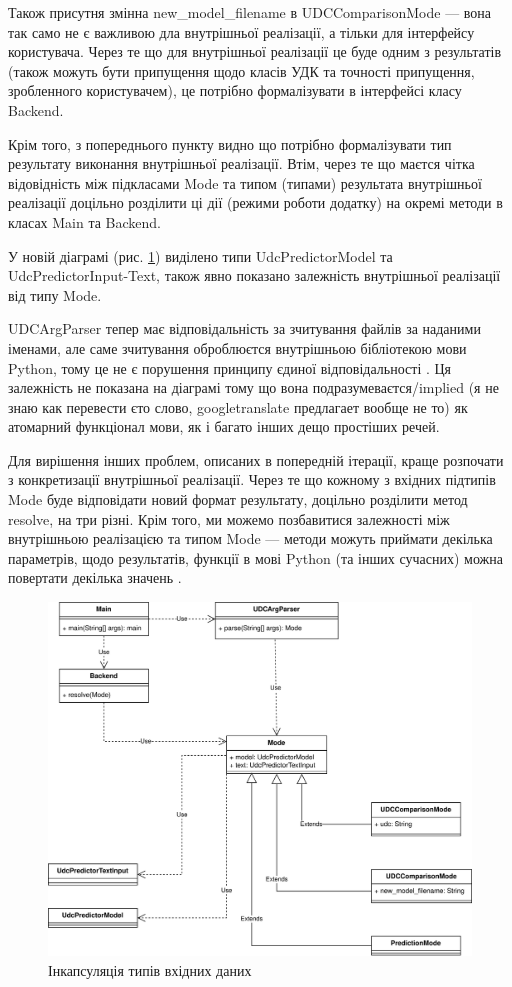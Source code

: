 \documentclass[14pt]{extarticle}
\begin{document}
  Також присутня змінна new\_model\_filename в UDCComparisonMode ---
  вона так само не є важливою дла внутрішньої реалізації,
  а тільки для інтерфейсу користувача.
  Через те що для внутрішньої реалізації це буде одним з результатів
  (також можуть бути припущення щодо класів УДК та точності припущення,
  зробленного користувачем),
  це потрібно формалізувати в інтерфейсі класу Backend.
  
  Крім того, з попереднього пункту видно
  що потрібно формалізувати тип результату виконання внутрішньої реалізації.
  Втім, через те що маєтся чітка відовідність між підкласами Mode
  та типом (типами) результата внутрішньої реалізації доцільно розділити
  ці дії (режими роботи додатку) на окремі методи в класах Main та Backend.

  У новій діаграмі (рис. \ref{fig:io_uml5})
  виділено типи UdcPredictorModel та UdcPredictorInput-Text,
  також явно показано залежність внутрішньої реалізації від типу Mode.

  UDCArgParser тепер має відповідальність
  за зчитування файлів за наданими іменами,
  але саме зчитування оброблюєтся внутрішньою бібліотекою мови Python,
  тому це не є порушення принципу єдиної відповідальності \cite{SRP_wiki}.
  Ця залежність не показана на діаграмі тому що вона подразумеваєтся/implied
  (я не знаю как перевести єто слово, googletranslate предлагает вообще не то)
  як атомарний функціонал мови, як і багато інших дещо простіших речей.

  Для вирішення інших проблем, описаних в попередній ітерації,
  краще розпочати з конкретизації внутрішньої реалізації.
  Через те що кожному з вхідних підтипів Mode буде відповідати новий формат
  результату, доцільно розділити метод resolve, на три різні.
  Крім того, ми можемо позбавитися залежності між
  внутрішньою реалізацією та типом Mode ---
  методи можуть приймати декілька параметрів,
  щодо результатів, функції в мові Python (та інших сучасних)
  можна повертати декілька значень
  \cite{python3_tuples_and_sequences}.

  \begin{figure}
    \centering
    \includegraphics[height=0.6\textwidth]{io_uml5.drawio.png}    
    \caption{Інкапсуляція типів вхідних даних}
    \label{fig:io_uml5}
  \end{figure}
\end{document}
